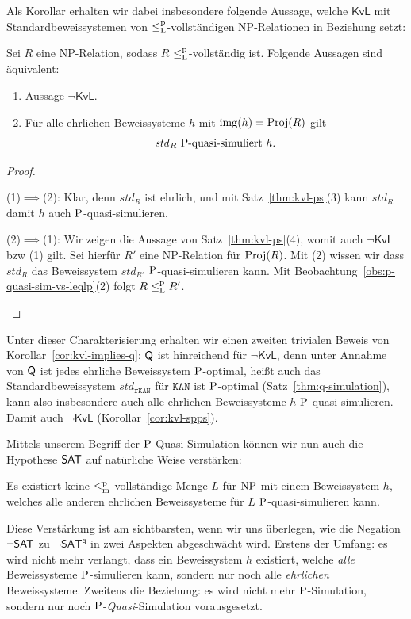 Als Korollar erhalten wir dabei insbesondere folgende Aussage, welche $\mathsf{KvL}$ mit Standardbeweissystemen von $\leqlp$-vollständigen NP-Relationen in Beziehung setzt:
\begin{corollary}\label{cor:kvl-spps}
    Sei $R$ eine NP-Relation, sodass $R$ $\leqlp$-vollständig ist.
    Folgende Aussagen sind äquivalent:
    \begin{enumerate}
        \item Aussage $\neg\mathsf{KvL}$.
        \item Für alle ehrlichen Beweissysteme $h$ mit $\img(h)=\Proj(R)$ gilt
        \[  \text{$\mathit{std}_R$ $\P$-quasi-simuliert $h$}. \]
    \end{enumerate}
\end{corollary}
\begin{proof}
    \begin{prooflist}
    \item (1)$\implies$(2): Klar, denn $\mathit{std}_R$ ist ehrlich, und mit Satz~\ref{thm:kvl-ps}(3) kann $\mathit{std}_R$ damit $h$ auch $\P$-quasi-simulieren.

    \item (2)$\implies$(1): Wir zeigen die Aussage von Satz~\ref{thm:kvl-ps}(4), womit auch $\neg\mathsf{KvL}$ bzw (1) gilt. Sei hierfür $R'$ eine NP-Relation für $\Proj(R)$. Mit (2) wissen wir dass $\mathit{std}_R$ das Beweissystem $\mathit{std}_{R'}$ $\P$-quasi-simulieren kann. Mit Beobachtung~\ref{obs:p-quasi-sim-vs-leqlp}(2) folgt $R\leqlp R'$.
    \end{prooflist}
\end{proof}

Unter dieser Charakterisierung erhalten wir einen zweiten trivialen Beweis von Korollar~\ref{cor:kvl-implies-q}: $\hQ$ ist hinreichend für $\neg\mathsf{KvL}$, denn unter Annahme von $\hQ$ ist jedes ehrliche Beweissystem $\P$-optimal, heißt auch das Standardbeweissystem $\mathit{std}_{\mathtt{rKAN}}$ für $\mathtt{KAN}$ ist $\P$-optimal (Satz~\ref{thm:q-simulation}), kann also insbesondere auch alle ehrlichen Beweissysteme $h$ $\P$-quasi-simulieren. Damit auch $\neg\mathsf{KvL}$ (Korollar~\ref{cor:kvl-spps}).

Mittels unserem Begriff der $\P$-Quasi-Simulation können wir nun auch die Hypothese $\hSAT$ auf natürliche Weise verstärken:
\begin{conjecture}
    Es existiert keine $\leqmp$-vollständige Menge $L$ für $\NP$ mit einem Beweissystem $h$, welches alle anderen ehrlichen Beweissysteme für $L$ $\P$-quasi-simulieren kann. 
\end{conjecture}
Diese Verstärkung ist am sichtbarsten, wenn wir uns überlegen, wie die Negation $\neg\hSAT$ zu $\neg\mathsf{SAT^{q}}$ in zwei Aspekten abgeschwächt wird.
Erstens der Umfang: es wird nicht mehr verlangt, dass ein Beweissystem $h$ existiert, welche \emph{alle} Beweissysteme $\P$-simulieren kann, sondern nur noch alle \emph{ehrlichen} Beweissysteme.
Zweitens die Beziehung: es wird nicht mehr $\P$-Simulation, sondern nur noch $\P$-\emph{Quasi}-Simulation vorausgesetzt.

